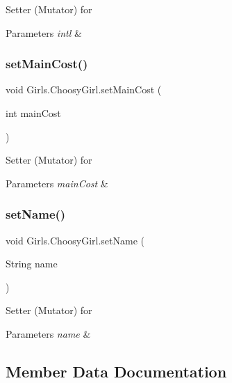 Setter (Mutator) for 
\begin{DoxyParams}{Parameters}
{\em intl} & \\
\hline
\end{DoxyParams}
\mbox{\label{class_girls_1_1_choosy_girl_a0bb45a2353bc83496229f2874900c317}} 
\subsubsection{\texorpdfstring{set\+Main\+Cost()}{setMainCost()}}
{\footnotesize\ttfamily void Girls.\+Choosy\+Girl.\+set\+Main\+Cost (\begin{DoxyParamCaption}\item[{int}]{main\+Cost }\end{DoxyParamCaption})\hspace{0.3cm}{\ttfamily [inline]}}

Setter (Mutator) for 
\begin{DoxyParams}{Parameters}
{\em main\+Cost} & \\
\hline
\end{DoxyParams}
\mbox{\label{class_girls_1_1_choosy_girl_aacfa276ca7d9668f3b51a4e6c05577d5}} 
\subsubsection{\texorpdfstring{set\+Name()}{setName()}}
{\footnotesize\ttfamily void Girls.\+Choosy\+Girl.\+set\+Name (\begin{DoxyParamCaption}\item[{String}]{name }\end{DoxyParamCaption})\hspace{0.3cm}{\ttfamily [inline]}}

Setter (Mutator) for 
\begin{DoxyParams}{Parameters}
{\em name} & \\
\hline
\end{DoxyParams}


\subsection{Member Data Documentation}
\mbox{\label{class_girls_1_1_choosy_girl_a80b299e65fa892996c25a1bb3af673ba}} 
